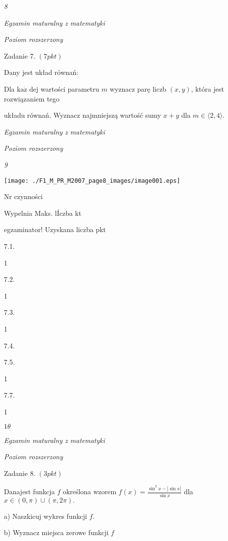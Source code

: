 \documentclass[a4paper,12pt]{article}
\begin{document}
{\it 8}

{\it Egzamin maturalny z matematyki}

{\it Poziom rozszerzony}

Zadanie 7. $(7pkt)$

Dany jest układ równań: 

Dla $\mathrm{k}\mathrm{a}\dot{\mathrm{z}}$ dej wartości parametru $m$ wyznacz parę liczb $(x,y)$, która jest rozwiązaniem tego

układu równań. Wyznacz najmniejszą wartość sumy $x+y$ dla $m\in\langle 2,4\rangle.$





{\it Egzamin maturalny z matematyki}

{\it Poziom rozszerzony}

{\it 9}
\begin{center}
\texttt{[image: ./F1\_M\_PR\_M2007\_page8\_images/image001.eps]}
\end{center}
Nr czynności

Wypelnia Maks. lÍczba kt

egzaminator! Uzyskana liczba pkt

7.1.

1

7.2.

1

7.3.

1

7.4.

7.5.

1

7.7.

1





$ 1\theta$

{\it Egzamin maturalny z matematyki}

{\it Poziom rozszerzony}

Zadanie 8. $(3pkt)$

Danajest funkcja $f$ określona wzorem $f(x)=\displaystyle \frac{\sin^{2}x-|\sin x|}{\sin x}$ dla $x\in(0,\pi)\cup(\pi,2\pi).$

a) Naszkicuj wykres funkcji $f.$

b) Wyznacz miejsca zerowe funkcji $f$
\end{document}

